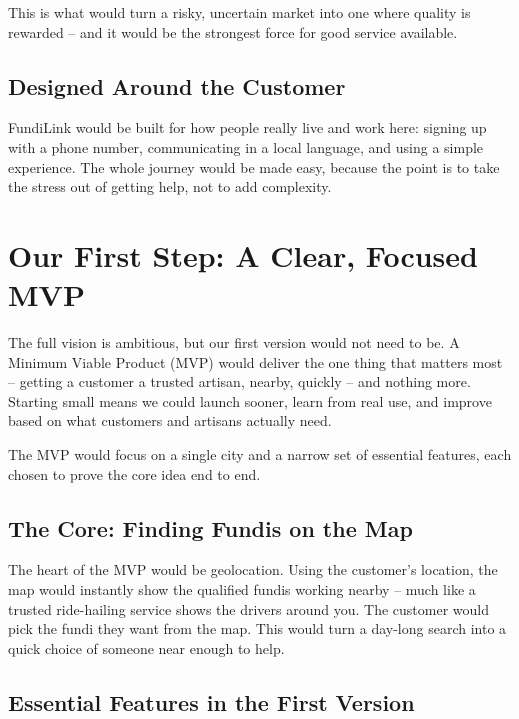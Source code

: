 \documentclass[11pt,a4paper]{article}
\begin{document}
This is what would turn a risky, uncertain market into one where quality is rewarded -- and it
would be the strongest force for good service available.

\subsection{Designed Around the Customer}

FundiLink would be built for how people really live and work here: signing up with a phone
number, communicating in a local language, and using a simple experience. The whole journey
would be made easy, because the point is to take the stress out of getting help, not to add
complexity.

\section{Our First Step: A Clear, Focused MVP}

The full vision is ambitious, but our first version would not need to be. A Minimum Viable
Product (MVP) would deliver the one thing that matters most -- getting a customer a trusted
artisan, nearby, quickly -- and nothing more. Starting small means we could launch sooner,
learn from real use, and improve based on what customers and artisans actually need.

The MVP would focus on a single city and a narrow set of essential features, each chosen to
prove the core idea end to end.

\subsection{The Core: Finding Fundis on the Map}

The heart of the MVP would be geolocation. Using the customer's location, the map would
instantly show the qualified fundis working nearby -- much like a trusted ride-hailing service
shows the drivers around you. The customer would pick the fundi they want from the map. This
would turn a day-long search into a quick choice of someone near enough to help.

\subsection{Essential Features in the First Version}
\end{document}
